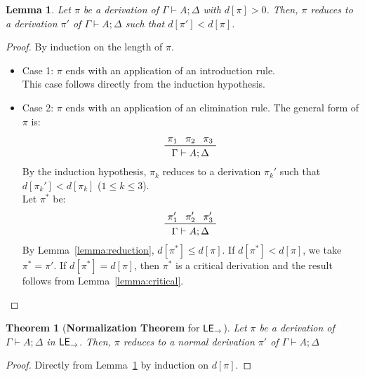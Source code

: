 \documentclass{article}
\newcommand{\lei}{$\text{\sffamily{LE}}_{\to}$}
\newtheorem{lemma}{Lemma}
\newtheorem{theorem}{Theorem}
\begin{document}
\begin{lemma}\label{lemma:main}
  Let $\pi$ be a derivation of $\Gamma\vdash A; \Delta$ with $d[\pi]>0$.
  Then, $\pi$ reduces to a derivation $\pi'$ of $\Gamma\vdash A; \Delta$ such that $d[\pi'] < d[\pi]$.
\end{lemma}
\begin{proof}
  By induction on the length of $\pi$.
  \begin{itemize}
  \item Case 1: $\pi$ ends with an application of an introduction rule. \\
    This case follows directly from the induction hypothesis.
  \item Case 2: $\pi$ ends with an application of an elimination rule. The general form of $\pi$ is:
    \[\prftree{\pi_1}{\pi_2}{\pi_3}{\Gamma\vdash A; \Delta}\]
    By the induction hypothesis, $\pi_k$ reduces to a derivation $\pi_k'$ such that $d[\pi_k'] < d[\pi_k]$ ($1 \leq k \leq 3$).\\
    Let $\pi^*$ be:
    \[\prftree{\pi_1'}{\pi_2'}{\pi_3'}{\Gamma\vdash A; \Delta}\]
    By Lemma~\ref{lemma:reduction}, $d[\pi^*]\leq d[\pi]$. If $d[\pi^*]<d[\pi]$, we take $\pi^* = \pi'$. If $d[\pi^*] = d[\pi]$, then $\pi^*$ is a critical derivation and the result follows from Lemma~\ref{lemma:critical}.
  \end{itemize}
\end{proof}

\begin{theorem}[\textbf{Normalization Theorem} for \lei{}]
  Let $\pi$ be a derivation of $\Gamma\vdash A; \Delta$ in \lei{}. Then, $\pi$ reduces to a normal derivation $\pi'$ of $\Gamma\vdash A; \Delta$
\end{theorem}
\begin{proof}
  Directly from Lemma~\ref{lemma:main} by induction on $d[\pi]$.
\end{proof}
\end{document}
